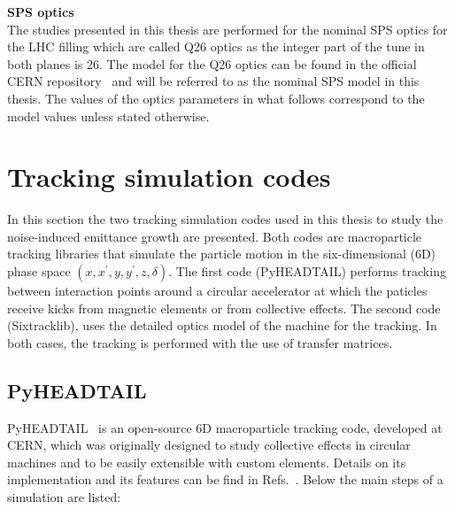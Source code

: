 \textbf{SPS optics}\\
The studies presented in this thesis are performed for the nominal SPS optics for the LHC filling which are called Q26 optics as the integer part of the tune in both planes is 26. The model for the Q26 optics can be found in the official CERN repository~\cite{SPS_optics_repo} and will be referred to as the nominal SPS model in this thesis. The values of the optics parameters in what follows correspond to the model values unless stated otherwise.
\normalsize{\textbf{} %



\section{Tracking simulation codes}\label{sec:simualtion_codes}
In this section the two tracking simulation codes used in this thesis to study the noise-induced emittance growth are presented. Both codes are macroparticle tracking libraries that simulate the particle motion in the six-dimensional (6D) phase space $(x, x^\prime, y, y^\prime, z, \delta)$. The first code (PyHEADTAIL) performs tracking between interaction points around a circular accelerator at which the paticles receive kicks from magnetic elements or from collective effects. The second code (Sixtracklib), uses the detailed optics model of the machine for the tracking. In both cases, the tracking is performed with the use of transfer matrices.

\subsection{PyHEADTAIL}\label{subsec:pyheadtail}

PyHEADTAIL~\cite{pyheadtail_repository} is an open-source 6D macroparticle tracking code, developed at CERN, which was originally designed to study collective effects in circular machines and to be easily extensible with custom elements. 
Details on its implementation and its features can be find in Refs.~\cite{pyheadtail_manual_adrian, pyheadtail_schenk}. Below the main steps of a simulation are listed: %


}
